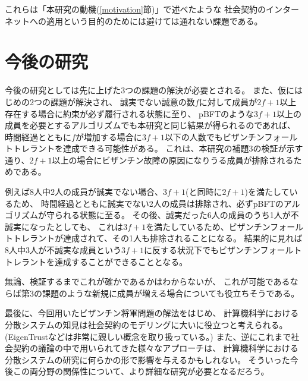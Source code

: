 これらは「本研究の動機(\ref{motivation}節)」で述べたような
社会契約のインターネットへの適用という目的のためには避けては通れない課題である。

\section{今後の研究}
今後の研究としては先に上げた3つの課題の解決が必要とされる。
また、仮にはじめの2つの課題が解決され、
誠実でない誠意の数$f$に対して成員が$2f+1$以上存在する場合に約束が必ず履行される状態に至り、
pBFT\cite{castro1999}のような$3f+1$以上の成員を必要とするアルゴリズムでも本研究と同じ結果が得られるのであれば、
時間経過とともに$f$が増加する場合に$3f+1$以下の人数でもビザンチンフォールトトレラントを達成できる可能性がある。
これは、本研究の補題3の検証が示す通り、$2f+1$以上の場合にビザンチン故障の原因になりうる成員が排除されるためである。

例えば8人中2人の成員が誠実でない場合、$3f+1$(と同時に$2f+1$)を満たしているため、
時間経過とともに誠実でない2人の成員は排除され、必ずpBFTのアルゴリズムが守られる状態に至る。
その後、誠実だった6人の成員のうち1人が不誠実になったとしても、
これは$3f+1$を満たしているため、ビザンチンフォールトトレラントが達成されて、その1人も排除されることになる。
結果的に見れば8人中3人が不誠実な成員という$3f+1$に反する状況下でもビザンチンフォールトトレラントを達成することができることとなる。

無論、検証するまでこれが確かであるかはわからないが、
これが可能であるならば第3の課題のような新規に成員が増える場合についても役立ちそうである。

最後に、今回用いたビザンチン将軍問題の解法をはじめ、
計算機科学における分散システムの知見は社会契約のモデリングに大いに役立つと考えられる。
(EigenTrust\cite{kamvar2003}などは非常に親しい概念を取り扱っている。)
また、逆にこれまで社会契約の議論の中で用いられてきた様々なアプローチは、
計算機科学における分散システムの研究に何らかの形で影響を与えるかもしれない。
そういった今後この両分野の関係性について、より詳細な研究が必要となるだろう。